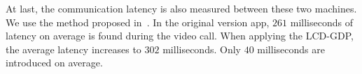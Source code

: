 At last, the communication latency is also measured between these two
machines. We use the method proposed in~\cite{yu2014can}. In the
original version app, $261$ milliseconds of latency on average is found
during the video call. When applying the LCD-GDP, the average latency
increases to $302$ milliseconds. Only $40$ milliseconds are
introduced on average. 













